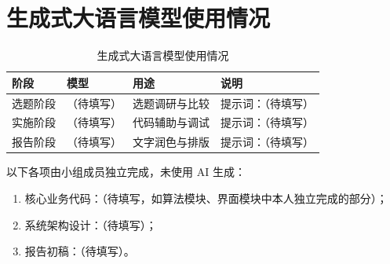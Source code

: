 \documentclass[12pt,a4paper]{ctexart}
\begin{document}
\section*{生成式大语言模型使用情况}

\begin{table}[H]
    \centering
    \caption{生成式大语言模型使用情况}
    \label{tab:llm}
    \begin{tabular}{llll}
        \toprule
        阶段 & 模型 & 用途 & 说明 \\
        \midrule
        选题阶段 & （待填写） & 选题调研与比较 & 提示词：（待填写） \\
        实施阶段 & （待填写） & 代码辅助与调试 & 提示词：（待填写） \\
        报告阶段 & （待填写） & 文字润色与排版 & 提示词：（待填写） \\
        \bottomrule
    \end{tabular}
\end{table}

以下各项由小组成员独立完成，未使用 AI 生成：
\begin{enumerate}
    \item 核心业务代码：（待填写，如算法模块、界面模块中本人独立完成的部分）；
    \item 系统架构设计：（待填写）；
    \item 报告初稿：（待填写）。
\end{enumerate}
\end{document}
